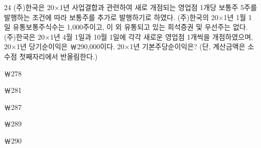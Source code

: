 \begin{question}{24}
(주)한국은 20×1년 사업결합과 관련하여 새로 개점되는 영업점 1개당 보통주 5주를 발행하는 조건에 따라 보통주를 추가로 발행하기로 하였다. (주)한국의 20×1년 1월 1일 유통보통주식수는 1,000주이고, 이 외 유통되고 있는 희석증권 및 우선주는 없다. (주)한국은 20×1년 4월 1일과 10월 1일에 각각 새로운 영업점 1개씩을 개점하였으며, 20×1년 당기순이익은 ￦290,000이다. 20×1년 기본주당순이익은? (단, 계산금액은 소수점 첫째자리에서 반올림한다.)
\begin{choices}
  \item ￦278
  \item ￦281
  \item ￦287
  \item ￦289
  \item ￦290
\end{choices}
\end{question}
